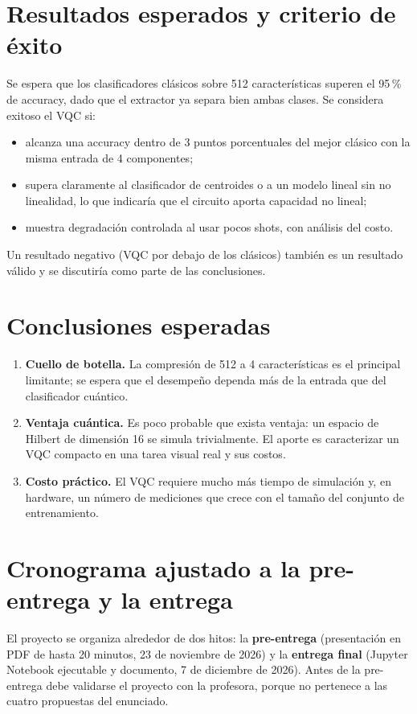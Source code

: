 \documentclass[11pt,letterpaper]{article}
\begin{document}
\section{Resultados esperados y criterio de éxito}
Se espera que los clasificadores clásicos sobre 512 características superen el 95\,\% de accuracy,
dado que el extractor ya separa bien ambas clases. Se considera exitoso el VQC si:
\begin{itemize}[leftmargin=*]
\item alcanza una accuracy dentro de 3 puntos porcentuales del mejor clásico con la misma entrada
de 4 componentes;
\item supera claramente al clasificador de centroides o a un modelo lineal sin no linealidad, lo
que indicaría que el circuito aporta capacidad no lineal;
\item muestra degradación controlada al usar pocos shots, con análisis del costo.
\end{itemize}
Un resultado negativo (VQC por debajo de los clásicos) también es un resultado válido y se
discutiría como parte de las conclusiones.

\section{Conclusiones esperadas}
\begin{enumerate}[leftmargin=*]
\item \textbf{Cuello de botella.} La compresión de 512 a 4 características es el principal limitante;
se espera que el desempeño dependa más de la entrada que del clasificador cuántico.
\item \textbf{Ventaja cuántica.} Es poco probable que exista ventaja: un espacio de Hilbert de dimensión
16 se simula trivialmente. El aporte es caracterizar un VQC compacto en una tarea visual real y sus costos.
\item \textbf{Costo práctico.} El VQC requiere mucho más tiempo de simulación y, en hardware, un
número de mediciones que crece con el tamaño del conjunto de entrenamiento.
\end{enumerate}

\section{Cronograma ajustado a la pre-entrega y la entrega}
El proyecto se organiza alrededor de dos hitos: la \textbf{pre-entrega} (presentación en PDF de hasta
20 minutos, 23 de noviembre de 2026) y la \textbf{entrega final} (Jupyter Notebook ejecutable y
documento, 7 de diciembre de 2026). Antes de la pre-entrega debe validarse el proyecto con la
profesora, porque no pertenece a las cuatro propuestas del enunciado.
\end{document}
